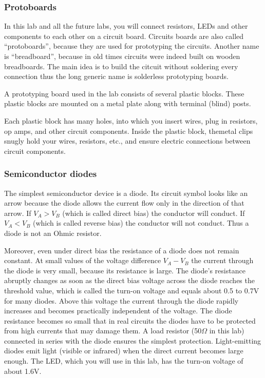 \documentclass{article}
\begin{document}
\subsubsection{Protoboards}
In this lab and all the future labs, you will connect resistors, LEDs and other components to each other on a circuit board. Circuits boards are also called “protoboards”, because they are used for prototyping the circuits. Another name is “breadboard”, because in old times circuits were indeed built on wooden breadboards. The main idea is to build the citcuit without soldering every connection thus the long generic name is solderless prototyping boards.

A prototyping board used in the lab consists of several plastic blocks. These plastic blocks are mounted on a metal plate along with terminal (blind) posts.

Each plastic block has many holes, into which you insert wires, plug in resistors, op amps, and other circuit components. Inside the plastic block, themetal clips snugly hold your wires, resistors, etc., and ensure electric connections between circuit components.

\subsubsection{Semiconductor diodes}
The simplest semiconductor device is a diode. Its circuit symbol looks like an arrow because the diode allows the current flow only in the direction of that arrow. If $V_A>V_B$ (which is called direct bias) the conductor will conduct. If $V_A<V_B$ (which is called reverse bias) the conductor will not conduct. Thus a diode is not an Ohmic resistor.

Moreover, even under direct bias the resistance of a diode does not remain constant. At small values of the voltage difference $V_A-V_B$ the current through the diode is very small, because its resistance is large. The diode’s resistance abruptly changes as soon as the direct bias voltage across the diode reaches the threshold value, which is called the turn-on voltage and equals about 0.5 to 0.7V for many diodes. Above this voltage the current through the diode rapidly increases and becomes practically independent of the voltage. The diode resistance becomes so small that in real circuits the diodes have to be protected from high currents that may damage them. A load resistor (50$\Omega$ in this lab) connected in series with the diode ensures the simplest protection.
Light-emitting diodes emit light (visible or infrared) when the direct current becomes large enough. The LED, which you will use in this lab, has the turn-on voltage of about 1.6V. 
\end{document}
